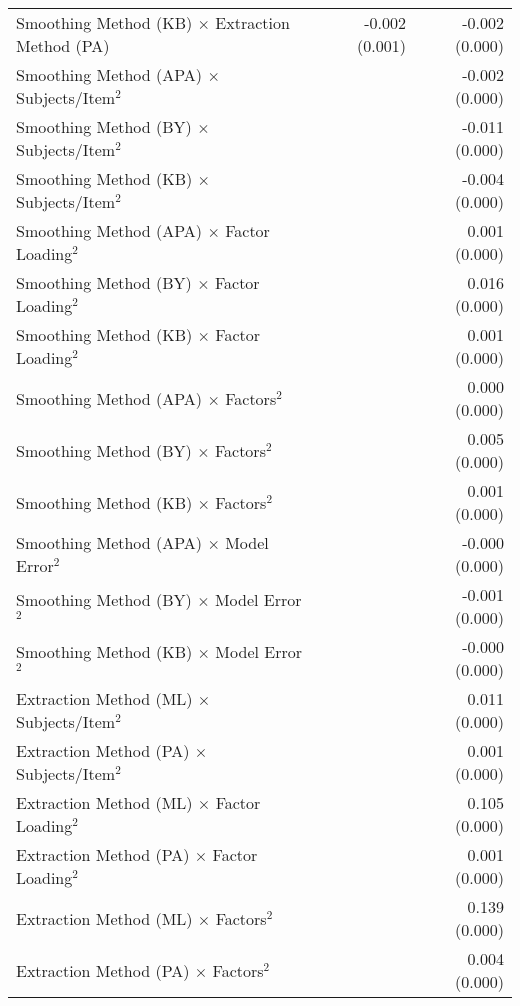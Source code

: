 \documentclass[
  english,
  man]{apa6}
\begin{document}
\begin{center}
\begin{longtable}{l D{)}{)}{11)0} D{)}{)}{11)0}}
Smoothing Method (KB) $\times$ Extraction Method (PA)  & -0.002 \; (0.001) & -0.002 \; (0.000) \\
Smoothing Method (APA) $\times$ Subjects/Item$^2$      &                   & -0.002 \; (0.000) \\
Smoothing Method (BY) $\times$ Subjects/Item$^2$       &                   & -0.011 \; (0.000) \\
Smoothing Method (KB) $\times$ Subjects/Item$^2$       &                   & -0.004 \; (0.000) \\
Smoothing Method (APA) $\times$ Factor Loading$^2$     &                   & 0.001 \; (0.000)  \\
Smoothing Method (BY) $\times$ Factor Loading$^2$      &                   & 0.016 \; (0.000)  \\
Smoothing Method (KB) $\times$ Factor Loading$^2$      &                   & 0.001 \; (0.000)  \\
Smoothing Method (APA) $\times$ Factors$^2$            &                   & 0.000 \; (0.000)  \\
Smoothing Method (BY) $\times$ Factors$^2$             &                   & 0.005 \; (0.000)  \\
Smoothing Method (KB) $\times$ Factors$^2$             &                   & 0.001 \; (0.000)  \\
Smoothing Method (APA) $\times$ Model Error$^2$        &                   & -0.000 \; (0.000) \\
Smoothing Method (BY) $\times$ Model Error$^2$         &                   & -0.001 \; (0.000) \\
Smoothing Method (KB) $\times$ Model Error$^2$         &                   & -0.000 \; (0.000) \\
Extraction Method (ML) $\times$ Subjects/Item$^2$      &                   & 0.011 \; (0.000)  \\
Extraction Method (PA) $\times$ Subjects/Item$^2$      &                   & 0.001 \; (0.000)  \\
Extraction Method (ML) $\times$ Factor Loading$^2$     &                   & 0.105 \; (0.000)  \\
Extraction Method (PA) $\times$ Factor Loading$^2$     &                   & 0.001 \; (0.000)  \\
Extraction Method (ML) $\times$ Factors$^2$            &                   & 0.139 \; (0.000)  \\
Extraction Method (PA) $\times$ Factors$^2$            &                   & 0.004 \; (0.000)  \\

\end{longtable}
\end{center}
\end{document}
